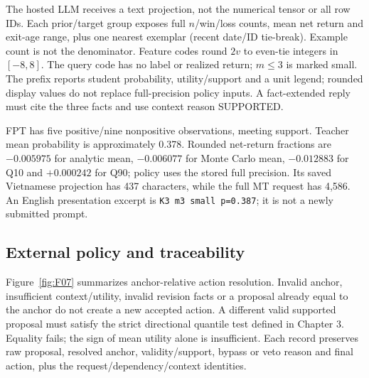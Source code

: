 The hosted LLM receives a text projection, not the numerical tensor or
all row IDs. Each prior/target group exposes full $n$/win/loss counts,
mean net return and exit-age range, plus one nearest exemplar (recent
date/ID tie-break). Example count is not the denominator. Feature codes
round $2v$ to even-tie integers in $[-8,8]$. The query code has no label
or realized return; $m\le3$ is marked small. The prefix reports student
probability, utility/support and a unit legend; rounded display values
do not replace full-precision policy inputs. A fact-extended reply must
cite the three facts and use context reason SUPPORTED.

FPT has five positive/nine nonpositive observations, meeting support.
Teacher mean probability is approximately 0.378. Rounded net-return
fractions are $-0.005975$ for analytic mean, $-0.006077$ for Monte Carlo
mean, $-0.012883$ for Q10 and $+0.000242$ for Q90; policy uses the
stored full precision. Its saved Vietnamese projection has 437 characters, while
the full MT request has 4,586. An English presentation excerpt is
\texttt{K3 m3 small p=0.387}; it is not a newly submitted prompt.

\subsection{External policy and traceability}\label{s:9b835e651fec3c25}
Figure~\ref{fig:F07} summarizes anchor-relative action resolution. Invalid
anchor, insufficient context/utility, invalid revision facts or a proposal
already equal to the anchor do not create a new accepted action. A
different valid supported proposal must satisfy the strict directional
quantile test defined in Chapter 3. Equality fails; the sign of mean
utility alone is insufficient. Each record preserves raw proposal,
resolved anchor, validity/support, bypass or veto reason and final action,
plus the request/dependency/context identities.

